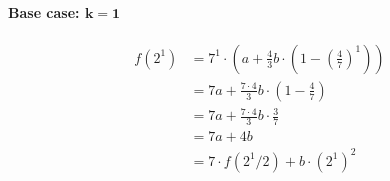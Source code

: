 \documentclass{article}
\begin{document}
\begin{enumerate}
{\begin{enumerate}[label={(\arabic*)}]
{                    \paragraph*{Base case: \(\mathbf{k = 1}\)}
                    \begin{displaymath}
                        \begin{aligned}
                            f(2^1) 
                            &= 7^1 \cdot \left( a + \frac{4}{3}b \cdot \left(1 - \left(\frac47\right)^{1}\right) \right) \\
                            &= 7a + \frac{7\cdot4}{3}b \cdot \left(1 - \frac47\right) \\
                            &= 7a + \frac{7\cdot4}{3}b \cdot \frac{3}{7} \\
                            &= 7a + 4b \\
                            &= 7\cdot f(2^1/2) + b\cdot(2^1)^2\\
                        \end{aligned}
                    \end{displaymath}
}
\end{enumerate}}
\end{enumerate}
\end{document}

